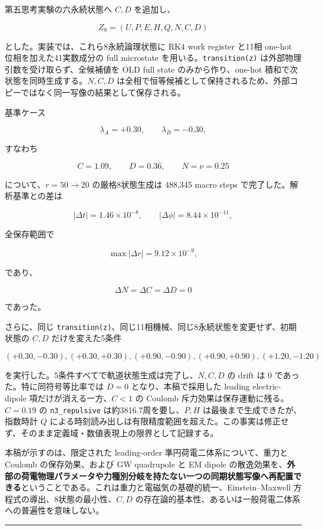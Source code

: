 \documentclass[
  a4paper,
]{ltjsarticle}
\begin{document}
第五思考実験の六永続状態へ \(C,D\) を追加し、

\[
\boxed{
Z_8=(U,P,E,H,Q,N,C,D)
}
\]

とした。実装では、これら8永続論理状態に RK4 work register と11相 one-hot
位相を加えた41実数成分の full microstate
を用いる。\texttt{transition(z)} は外部物理引数を受け取らず、全候補値を
OLD full state のみから作り、one-hot
積和で次状態を同時生成する。\(N,C,D\)
は全相で恒等候補として保持されるため、外部コピーではなく同一写像の結果として保存される。

基準ケース

\[
\lambda_A=+0.30,
\qquad
\lambda_B=-0.30,
\]

すなわち

\[
C=1.09,
\qquad
D=0.36,
\qquad
N=\nu=0.25
\]

について、\(r=50\rightarrow20\) の厳格8状態生成は 488,345 macro steps
で完了した。解析基準との差は

\[
|\Delta t|=1.46\times10^{-8},
\qquad
|\Delta\phi|=8.44\times10^{-11},
\]

全保存範囲で

\[
\max|\Delta r|=9.12\times10^{-9},
\]

であり、

\[
\Delta N=\Delta C=\Delta D=0
\]

であった。

さらに、同じ
\texttt{transition(z)}、同じ11相機械、同じ8永続状態を変更せず、初期状態の
\(C,D\) だけを変えた5条件

\[
(+0.30,-0.30),
(+0.30,+0.30),
(+0.90,-0.90),
(+0.90,+0.90),
(+1.20,-1.20)
\]

を実行した。5条件すべてで軌道状態生成は完了し、\(N,C,D\) の drift は 0
であった。特に同符号等比率では \(D=0\) となり、本稿で採用した leading
electric-dipole 項だけが消える一方、\(C<1\) の Coulomb
斥力効果は保存運動に残る。\(C=0.19\) の \texttt{n3\_repulsive}
は約3816.7周を要し、\(P,H\) は最後まで生成できたが、指数時計 \(Q\)
による時刻読み出しは有限精度範囲を超えた。この事実は修正せず、そのまま定義域・数値表現上の限界として記録する。

本稿が示すのは、限定された leading-order 準円荷電二体系について、重力と
Coulomb の保存効果、および GW quadrupole と EM dipole
の散逸効果を、\textbf{外部の荷電物理パラメータや力種別分岐を持たない一つの同期状態写像へ再配置できる}ということである。これは重力と電磁気の基礎的統一、Einstein--Maxwell
方程式の導出、8状態の最小性、\(C,D\)
の存在論的基本性、あるいは一般荷電二体系への普遍性を意味しない。

\begin{center}\rule{0.5\linewidth}{0.5pt}\end{center}
\end{document}
